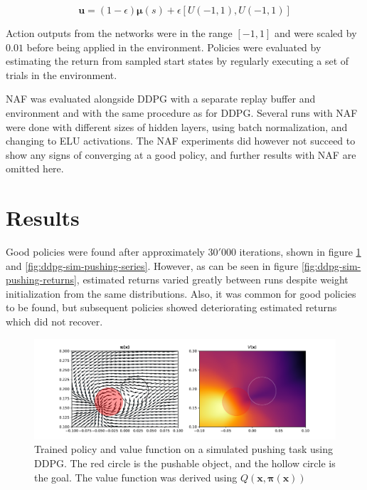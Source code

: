 \begin{equation}
    \mathbf{u} = (1 - \epsilon) \mathbf{\mu}(s) + \epsilon \left[U(-1, 1), U(-1, 1)\right]
\end{equation}

Action outputs from the networks were in the range $[-1, 1]$ and were scaled by
$0.01$ before being applied in the environment. Policies were evaluated by
estimating the return from sampled start states by regularly executing a set of
trials in the environment.

NAF was evaluated alongside DDPG with a separate replay buffer and environment
and with the same procedure as for DDPG. Several runs with NAF were done with
different sizes of hidden layers, using batch normalization, and changing to
ELU activations. The NAF experiments did however not succeed to show any signs
of converging at a good policy, and further results with NAF are omitted here.

\section{Results}

Good policies were found after approximately $30'000$ iterations, shown in
figure \ref{fig:ddpg-sim-pushing-pi-v} and \ref{fig:ddpg-sim-pushing-series}.
However, as can be seen in figure \ref{fig:ddpg-sim-pushing-returns}, estimated
returns varied greatly between runs despite weight initialization from the same
distributions. Also, it was common for good policies to be found, but
subsequent policies showed deteriorating estimated returns which did not
recover.

\begin{figure}[h!]
    \centering
    \includegraphics[width=1.0 \textwidth]{res/ddpg-pushing-pi-v.pdf}

    \caption{Trained policy and value function on a simulated pushing task
    using DDPG. The red circle is the pushable object, and the hollow circle is
    the goal. The value function was derived using $Q(\mathbf{x, \pi(x)})$}

    \label{fig:ddpg-sim-pushing-pi-v}

\end{figure}

